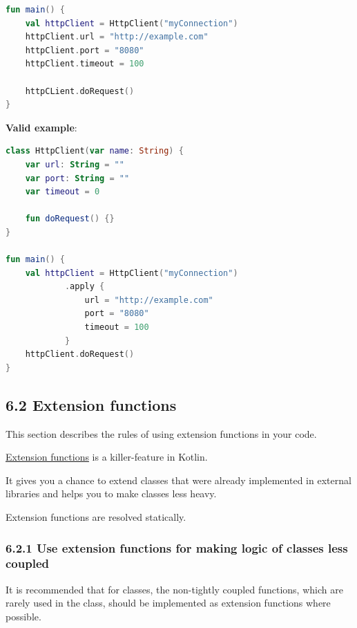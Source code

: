 {{{{\begin{lstlisting}[language=Kotlin]
fun main() {
    val httpClient = HttpClient("myConnection")
    httpClient.url = "http://example.com"
    httpClient.port = "8080"
    httpClient.timeout = 100
    
    httpCLient.doRequest()
}   

\end{lstlisting}


\textbf{Valid example}:

\begin{lstlisting}[language=Kotlin]
class HttpClient(var name: String) {
    var url: String = ""
    var port: String = ""
    var timeout = 0

    fun doRequest() {}
}

fun main() {
    val httpClient = HttpClient("myConnection")
            .apply {
                url = "http://example.com"
                port = "8080"
                timeout = 100
            }
    httpClient.doRequest()
}
\end{lstlisting}


\subsection*{\textbf{6.2 Extension functions}}

\label{sec:6.2}

This section describes the rules of using extension functions in your code.



\href{https://kotlinlang.org/docs/reference/extensions.html}{Extension functions} is a killer-feature in Kotlin. 

It gives you a chance to extend classes that were already implemented in external libraries and helps you to make classes less heavy.

Extension functions are resolved statically.



\subsubsection*{\textbf{6.2.1 Use extension functions for making logic of classes less coupled}}
\leavevmode\newline

\label{sec:6.2.1}

It is recommended that for classes, the non-tightly coupled functions, which are rarely used in the class, should be implemented as extension functions where possible.

}}}}
